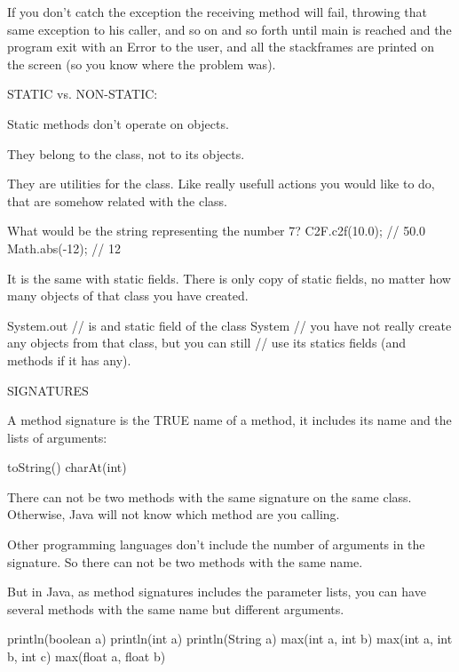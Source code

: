 \documentclass[a4paper, 9pt]{extarticle}
\begin{document}
If you don't catch the exception the receiving method will fail, throwing that
same exception to his caller, and so on and so forth until main is reached and
the program exit with an Error to the user, and all the stackframes are printed
on the screen (so you know where the problem was).

STATIC vs. NON-STATIC:

Static methods don't operate on objects.

They belong to the class, not to its objects.

They are utilities for the class. Like really usefull actions you would like to
do, that are somehow related with the class.

\begin{blackboard}
What would be the string representing the number 7?
C2F.c2f(10.0); // 50.0
Math.abs(-12); // 12
\end{blackboard}

It is the same with static fields.  There is only copy of static fields, no
matter how many objects of that class you have created.

\begin{blackboard}
System.out // is and static field of the class System
  // you have not really create any objects from that class, but you can still
  // use its statics fields (and methods if it has any).
\end{blackboard}

SIGNATURES

A method signature is the TRUE name of a method, it includes its name and the
lists of arguments:

\begin{blackboard}
toString()
charAt(int)
\end{blackboard}

There can not be two methods with the same signature on the same class.
Otherwise, Java will not know which method are you calling.

Other programming languages don't include the number of arguments in the
signature. So there can not be two methods with the same name.

But in Java, as method signatures includes the parameter lists, you can have
several methods with the same name but different arguments.

\begin{blackboard}
println(boolean a)
println(int a)
println(String a)
max(int a, int b)
max(int a, int b, int c)
max(float a, float b)
\end{blackboard}
\end{document}
